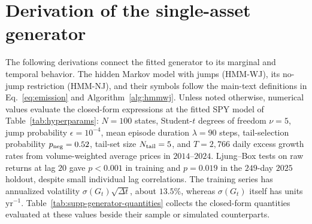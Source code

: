 \section{Derivation of the single-asset generator}
\label{sec:supp-generator}

The following derivations connect the fitted generator to its marginal and temporal behavior. The hidden Markov model with jumps (HMM-WJ), its no-jump
restriction (HMM-NJ), and their symbols follow the main-text
definitions in Eq.~\eqref{eq:emission} and
Algorithm~\ref{alg:hmmwj}. Unless noted otherwise, numerical values
evaluate the closed-form expressions at the fitted SPY model of
Table~\ref{tab:hyperparams}: $N = 100$ states, Student-$t$ degrees of
freedom $\nu = 5$, jump probability $\epsilon = 10^{-4}$, mean episode
duration $\lambda = 90$ steps, tail-selection probability
$p_{\rm neg} = 0.52$, tail-set size $N_{\rm tail} = 5$, and $T = 2{,}766$ daily excess growth rates from volume-weighted average prices in $2014$--$2024$. Ljung--Box tests on raw returns at lag $20$ gave $p<0.001$ in training and $p=0.019$ in the $249$-day $2025$ holdout, despite small individual lag correlations. The training series has annualized volatility $\sigma(G_t)\sqrt{\Delta t}$, about $13.5\%$, whereas $\sigma(G_t)$ itself has units $\mathrm{yr}^{-1}$.
Table~\ref{tab:supp-generator-quantities} collects the closed-form
quantities evaluated at these values beside their sample or simulated
counterparts.

\begin{table}[H]
\centering
\caption{\textbf{Closed-form quantities of the fitted SPY generator
    against sample and simulated values.} Entries evaluate the expressions below at the fitted SPY model of Table~\ref{tab:hyperparams}; jump-path entries use the stated single-episode and finite-horizon approximations. Sample values are computed
    from the in-sample SPY series; simulated values use $400$
    in-sample-length paths for the jump-episode quantities (forced-step
    fraction, jump-path probability, and forced fraction within a jump
    path) and $1{,}000$ paths for mean sample skewness. The sup-distance entry is
    the largest gap between the no-jump model's stationary distribution
    function and the in-sample empirical distribution function; for
    comparison, the two-sample Kolmogorov--Smirnov critical value used
    by the path-level tests at $\alpha = 0.05$ for two samples of
    $T = 2{,}766$ observations is $1.358\sqrt{2/T} = 0.0365$. Observed
    autocorrelations are those of the in-sample series shown in
    Fig.~\ref{fig:empirical_motivation}d. Stationary moments describe
    the no-jump mixture unless labeled otherwise. Here $A_t=|G_t|$
    and $\theta_2$ is the transition matrix's second-largest eigenvalue
    in modulus.}
\label{tab:supp-generator-quantities}
\footnotesize
\resizebox{\textwidth}{!}{}
\end{table}

